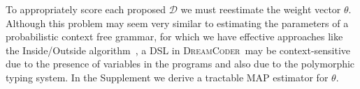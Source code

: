 \documentclass{article}
\newcommand{\system}{\textsc{DreamCoder}~}
\DeclareMathOperator*{\argmax}{arg\,max} %
\newcommand{\probability}{\mathds{P}} %
\begin{document}
To appropriately score each proposed $\mathcal{D}$ we must reestimate the weight vector $\theta$.
Although this problem may seem 
very similar to estimating the parameters of a probabilistic context free grammar,
for which we have effective approaches like the Inside/Outside algorithm~\cite{international2000derivation},
a DSL in \system may be context-sensitive due to the presence of variables
in the programs and also due to the polymorphic typing system.
In the Supplement we derive a tractable MAP estimator for $\theta$.
\end{document}
